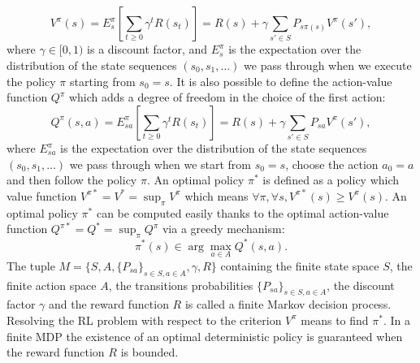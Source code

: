 \documentclass{article}
\begin{document}
\begin{equation}
\label{Vdef.eqn}
V^\pi(s) = E^\pi_s[\sum_{t\geq0}\gamma^tR(s_t)]=R(s) + \gamma\sum_{s'\in S}P_{s\pi(s)} V^\pi(s'),
\end{equation}
where $\gamma \in [0,1)$ is a discount factor, and $E^\pi_s$ is the expectation over the distribution of the state sequences $(s_0,s_1,\dots)$ we pass through when we execute the policy $\pi$ starting from $s_0=s$. It is also possible to define the action-value function $Q^\pi$ which adds a degree of freedom in the choice of the first action:
\begin{equation}
\label{Qdef.eqn}
Q^\pi(s,a) = E^\pi_{sa}[\sum_{t\geq0}\gamma^tR(s_t)]=R(s) + \gamma\sum_{s'\in S}P_{sa} V^\pi(s'),
\end{equation}
where $E^\pi_{sa}$ is the expectation over the distribution of the state sequences $(s_0,s_1,\dots)$ we pass through when we start from $s_0=s$, choose the action $a_0=a$ and then follow the policy $\pi$.
An optimal policy $\pi^*$ is defined as a policy which value function $V^{\pi*}=V^*=\sup_{\pi}V^{\pi}$ which means $\forall \pi, \forall s, V^{\pi*}(s) \geq V^\pi(s)$. An optimal policy $\pi^*$ can be computed easily thanks to the optimal action-value function $Q^{\pi*}=Q^*=\sup_{\pi}Q^\pi$ via a greedy mechanism:
\begin{equation}
\label{greedy.eqn}
\pi^*(s) \in \arg\max_{a\in A} Q^*(s,a).
\end{equation}
The tuple $M=\{S,A,\{P_{sa}\}_{s\in S,a\in A},\gamma,R\}$ containing the finite state space $S$, the finite action space $A$, the transitions probabilities $\{P_{sa}\}_{s\in S,a\in A}$, the discount factor $\gamma$ and the reward function $R$ is called a finite Markov decision process. Resolving the RL problem with respect to the criterion $V^\pi$  means to find $\pi^*$. In a finite MDP the existence of an optimal deterministic policy is guaranteed when the reward function $R$ is bounded.\\
\end{document}
